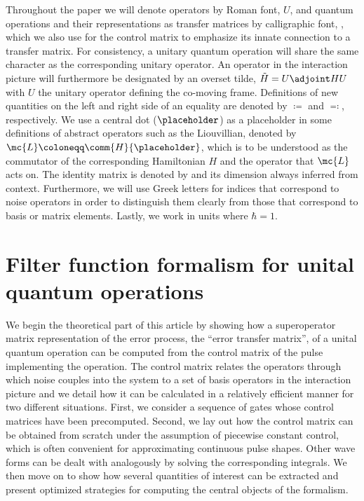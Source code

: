 Throughout the paper we will denote operators by Roman font, \eg $U$, and quantum operations and their representations as transfer matrices by calligraphic font, \eg \liouvU, which we also use for the control matrix \ctrlmat to emphasize its innate connection to a transfer matrix. For consistency, a unitary quantum operation will share the same character as the corresponding unitary operator. An operator in the interaction picture will furthermore be designated by an overset tilde, \eg $\tilde{H} = U\adjoint H U$ with $U$ the unitary operator defining the co-moving frame. Definitions of new quantities on the left and right side of an equality are denoted by $\coloneqq$ and $\eqqcolon$, respectively. We use a central dot ($\placeholder$) as a placeholder in some definitions of abstract operators such as the Liouvillian, denoted by $\mc{L}\coloneqq\comm{H}{\placeholder}$, which is to be understood as the commutator of the corresponding Hamiltonian $H$ and the operator that $\mc{L}$ acts on. The identity matrix is denoted by \eye and its dimension always inferred from context. Furthermore, we will use Greek letters for indices that correspond to noise operators in order to distinguish them clearly from those that correspond to basis or matrix elements. Lastly, we work in units where $\hbar =  1$.

\section{Filter function formalism for unital quantum operations}\label{sec:theory}
We begin the theoretical part of this article by showing how a superoperator matrix representation of the error process, the \enquote{error transfer matrix}, of a unital quantum operation can be computed from the control matrix of the pulse implementing the operation. The control matrix relates the operators through which noise couples into the system to a set of basis operators in the interaction picture and we detail how it can be calculated in a relatively efficient manner for two different situations. First, we consider a sequence of gates whose control matrices have been precomputed. Second, we lay out how the control matrix can be obtained from scratch under the assumption of piecewise constant control, which is often convenient for approximating continuous pulse shapes. Other wave forms can be dealt with analogously by solving the corresponding integrals. We then move on to show how several quantities of interest can be extracted and present optimized strategies for computing the central objects of the formalism.

